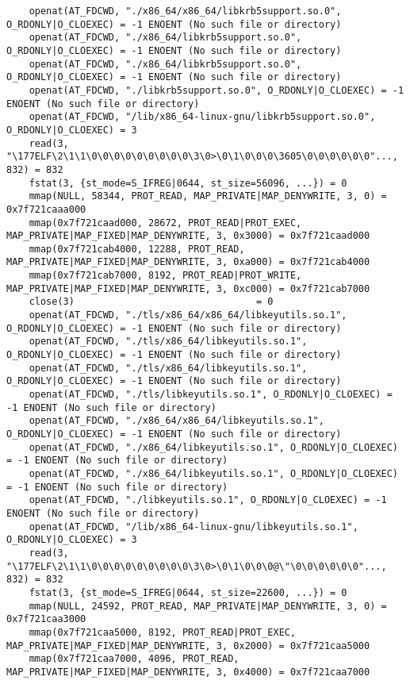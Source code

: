 \documentclass[pdf, unicode, 12pt, a4paper,oneside,fleqn]{article}
\begin{document}
{\begin{verbatim}
    openat(AT_FDCWD, "./x86_64/x86_64/libkrb5support.so.0", O_RDONLY|O_CLOEXEC) = -1 ENOENT (No such file or directory)
    openat(AT_FDCWD, "./x86_64/libkrb5support.so.0", O_RDONLY|O_CLOEXEC) = -1 ENOENT (No such file or directory)
    openat(AT_FDCWD, "./x86_64/libkrb5support.so.0", O_RDONLY|O_CLOEXEC) = -1 ENOENT (No such file or directory)
    openat(AT_FDCWD, "./libkrb5support.so.0", O_RDONLY|O_CLOEXEC) = -1 ENOENT (No such file or directory)
    openat(AT_FDCWD, "/lib/x86_64-linux-gnu/libkrb5support.so.0", O_RDONLY|O_CLOEXEC) = 3
    read(3, "\177ELF\2\1\1\0\0\0\0\0\0\0\0\0\3\0>\0\1\0\0\0\3605\0\0\0\0\0\0"..., 832) = 832
    fstat(3, {st_mode=S_IFREG|0644, st_size=56096, ...}) = 0
    mmap(NULL, 58344, PROT_READ, MAP_PRIVATE|MAP_DENYWRITE, 3, 0) = 0x7f721caaa000
    mmap(0x7f721caad000, 28672, PROT_READ|PROT_EXEC, MAP_PRIVATE|MAP_FIXED|MAP_DENYWRITE, 3, 0x3000) = 0x7f721caad000
    mmap(0x7f721cab4000, 12288, PROT_READ, MAP_PRIVATE|MAP_FIXED|MAP_DENYWRITE, 3, 0xa000) = 0x7f721cab4000
    mmap(0x7f721cab7000, 8192, PROT_READ|PROT_WRITE, MAP_PRIVATE|MAP_FIXED|MAP_DENYWRITE, 3, 0xc000) = 0x7f721cab7000
    close(3)                                = 0
    openat(AT_FDCWD, "./tls/x86_64/x86_64/libkeyutils.so.1", O_RDONLY|O_CLOEXEC) = -1 ENOENT (No such file or directory)
    openat(AT_FDCWD, "./tls/x86_64/libkeyutils.so.1", O_RDONLY|O_CLOEXEC) = -1 ENOENT (No such file or directory)
    openat(AT_FDCWD, "./tls/x86_64/libkeyutils.so.1", O_RDONLY|O_CLOEXEC) = -1 ENOENT (No such file or directory)
    openat(AT_FDCWD, "./tls/libkeyutils.so.1", O_RDONLY|O_CLOEXEC) = -1 ENOENT (No such file or directory)
    openat(AT_FDCWD, "./x86_64/x86_64/libkeyutils.so.1", O_RDONLY|O_CLOEXEC) = -1 ENOENT (No such file or directory)
    openat(AT_FDCWD, "./x86_64/libkeyutils.so.1", O_RDONLY|O_CLOEXEC) = -1 ENOENT (No such file or directory)
    openat(AT_FDCWD, "./x86_64/libkeyutils.so.1", O_RDONLY|O_CLOEXEC) = -1 ENOENT (No such file or directory)
    openat(AT_FDCWD, "./libkeyutils.so.1", O_RDONLY|O_CLOEXEC) = -1 ENOENT (No such file or directory)
    openat(AT_FDCWD, "/lib/x86_64-linux-gnu/libkeyutils.so.1", O_RDONLY|O_CLOEXEC) = 3
    read(3, "\177ELF\2\1\1\0\0\0\0\0\0\0\0\0\3\0>\0\1\0\0\0@\"\0\0\0\0\0\0"..., 832) = 832
    fstat(3, {st_mode=S_IFREG|0644, st_size=22600, ...}) = 0
    mmap(NULL, 24592, PROT_READ, MAP_PRIVATE|MAP_DENYWRITE, 3, 0) = 0x7f721caa3000
    mmap(0x7f721caa5000, 8192, PROT_READ|PROT_EXEC, MAP_PRIVATE|MAP_FIXED|MAP_DENYWRITE, 3, 0x2000) = 0x7f721caa5000
    mmap(0x7f721caa7000, 4096, PROT_READ, MAP_PRIVATE|MAP_FIXED|MAP_DENYWRITE, 3, 0x4000) = 0x7f721caa7000

\end{verbatim}}
\end{document}
